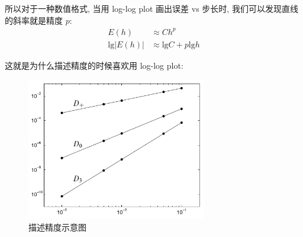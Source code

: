 所以对于一种数值格式, 当用 log-log plot 画出误差 vs 步长时, 我们可以发现直线的斜率就是精度 $p$:
\begin{equation}
    \begin{aligned}
        E(h) &\approx C h^p \\
        \mathrm{lg} |E(h)| &\approx \mathrm{lg} C + p\mathrm{lg} h
    \end{aligned}
\end{equation}

这就是为什么描述精度的时候喜欢用 log-log plot:
\begin{figure}[!hbtp]
    \centering
    \includegraphics[width=0.7\textwidth]{figs/accuracy_temp.png} 
    \caption{描述精度示意图}
\end{figure}



